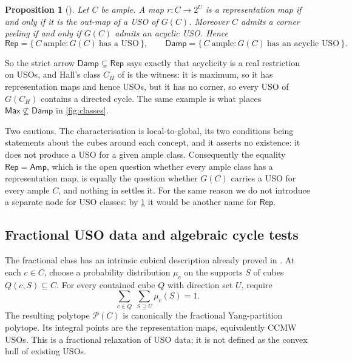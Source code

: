 \documentclass[11pt]{article}
\newtheorem{proposition}{Proposition}[section]
\theoremstyle{definition}
\newcommand{\Amp}{\mathsf{Amp}}
\newcommand{\Max}{\mathsf{Max}}
\newcommand{\Damp}{\mathsf{Damp}}
\newcommand{\Rep}{\mathsf{Rep}}
\begin{document}
\begin{proposition}[{\cite[Theorem~6.8 and Proposition~6.12]{CCMW}}]
\label{prop:uso-dictionary}
Let $C$ be ample. A map $r:C\to2^{U}$ is a representation map if and only if it
is the out-map of a USO of $G(C)$. Moreover $C$ admits a corner peeling if and
only if $G(C)$ admits an \emph{acyclic} USO. Hence
\[
  \Rep=\{\,C\ \text{ample}:G(C)\ \text{has a USO}\,\},
  \qquad
  \Damp=\{\,C\ \text{ample}:G(C)\ \text{has an acyclic USO}\,\}.
\]
\end{proposition}

So the strict arrow $\Damp\subsetneq\Rep$ says exactly that acyclicity is a real
restriction on USOs, and Hall's class $C_{H}$ of \cite[Theorem~4.5]{CCMW} is the
witness: it is maximum, so it has representation maps and hence USOs, but it has
no corner, so every USO of $G(C_{H})$ contains a directed cycle. The same
example is what places $\Max\not\subseteq\Damp$ in \cref{fig:classes}.

Two cautions. The characterisation is local-to-global, its two conditions being
statements about the cubes around each concept, and it asserts no existence: it
does not produce a USO for a given ample class. Consequently the equality
$\Rep=\Amp$, which is the open question whether every ample class has a
representation map, is equally the question whether $G(C)$ carries a USO for
every ample $C$, and nothing in \cite{CCMW} settles it. For the same reason we
do not introduce a separate node for USO classes: by
\cref{prop:uso-dictionary} it would be another name for $\Rep$.


\subsection{Fractional USO data and algebraic cycle tests}
\label{sec:fractional-uso-tests}

The fractional class has an intrinsic cubical description already proved
in \cite[Theorem~\textnormal{Cell-to-vertex reformulation}]{AlgebraicAmple}.
At each $c\in C$, choose a probability distribution $\mu_c$ on the
supports $S$ of cubes $Q(c,S)\subseteq C$. For every contained cube $Q$
with direction set $U$, require
\begin{equation}\label{eq:fractional-cube-ownership}
 \sum_{c\in Q}\ \sum_{S\supseteq U}\mu_c(S)=1.
\end{equation}
The resulting polytope $\mathcal P(C)$ is canonically the fractional
Yang-partition polytope. Its integral points are the representation
maps, equivalently CCMW USOs. This is a fractional relaxation of USO
data; it is not defined as the convex hull of existing USOs.
\end{document}
